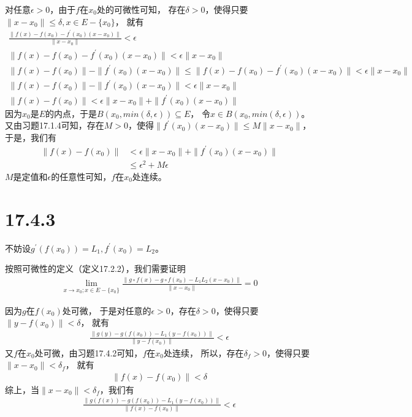 \documentclass{article}
\begin{document}
对任意$\epsilon > 0$，由于$f$在$x_0$处的可微性可知，
存在$\delta > 0$，使得只要$\|x - x_0\| \leq \delta, x \in E - \{x_0\}$，
就有
\begin{align*}
  \frac{\|f(x) - f(x_0) - f^\prime(x_0)(x - x_0)\|}{\|x - x_0\|} < \epsilon                                             \\
  \|f(x) - f(x_0) - f^\prime(x_0)(x - x_0)\| < \epsilon \|x - x_0\|                                                     \\
  \|f(x) - f(x_0)\| - \|f^\prime(x_0)(x - x_0)\| \leq \|f(x) - f(x_0) - f^\prime(x_0)(x - x_0)\| < \epsilon \|x - x_0\| \\
  \|f(x) - f(x_0)\| - \|f^\prime(x_0)(x - x_0)\| < \epsilon \|x - x_0\|                                                 \\
  \|f(x) - f(x_0)\| < \epsilon \|x - x_0\| + \|f^\prime(x_0)(x - x_0)\|
\end{align*}
因为$x_0$是$E$的内点，于是$B(x_0, min(\delta, \epsilon)) \subseteq E$，
令$x \in B(x_0, min(\delta, \epsilon))$。
又由习题17.1.4可知，存在$M > 0$，使得$\|f^\prime(x_0)(x - x_0)\| \leq M \|x - x_0\|$，
于是，我们有
\begin{align*}
  \|f(x) - f(x_0)\| & < \epsilon \|x - x_0\| + \|f^\prime(x_0)(x - x_0)\| \\
                    & \leq \epsilon^2 + M \epsilon
\end{align*}
$M$是定值和$\epsilon$的任意性可知，$f$在$x_0$处连续。

\section*{17.4.3}
不妨设$g^\prime(f(x_0)) = L_1, f^\prime(x_0) = L_2$。

按照可微性的定义（定义17.2.2），我们需要证明
\begin{align*}
  \lim_{x \to x_0; x \in E - \{x_0\}} \frac{\|g \circ f(x) - g \circ f(x_0) - L_1L_2(x - x_0)\|}{\|x - x_0\|} = 0
\end{align*}

因为$g$在$f(x_0)$处可微，
于是对任意的$\epsilon > 0$，存在$\delta > 0$，使得只要$\|y - f(x_0)\| < \delta$，
就有
\begin{align*}
  \frac{\|g(y) - g(f(x_0)) - L_1(y - f(x_0))\|}{\|y - f(x_0)\|} < \epsilon
\end{align*}
又$f$在$x_0$处可微，由习题17.4.2可知，$f$在$x_0$处连续，
所以，存在$\delta_f > 0$，使得只要$\|x - x_0\| < \delta_f$，
就有
\begin{align*}
  \|f(x) - f(x_0)\| < \delta
\end{align*}
综上，当$\|x - x_0\| < \delta_f$，我们有
\begin{align}
  \frac{\|g(f(x)) - g(f(x_0)) - L_1(y - f(x_0))\|}{\|f(x) - f(x_0)\|} < \epsilon
\end{align}
\end{document}

